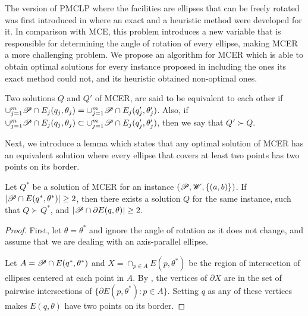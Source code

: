 The version of PMCLP where the facilities are ellipses that can be freely rotated was first introduced in \cite{andreta} where an exact and a heuristic method were developed for it. In comparison with MCE, this problem introduces a new variable that is responsible for determining the angle of rotation of every ellipse, making MCER a more challenging problem. We propose an algorithm for MCER which is able to obtain optimal solutions for every instance proposed in \cite{andreta} including the ones its exact method could not, and its heuristic obtained non-optimal ones.

\begin{definition}
	Two solutions $Q$ and $Q'$ of MCER, are said to be equivalent to each other if \mbox{$\cup_{j=1}^m \mathscr{P} \cap E_j(q_j, \theta_j) = \cup_{j=1}^m \mathscr{P} \cap E_j(q_j', \theta_j')$}. Also, if $\cup_{j=1}^m \mathscr{P} \cap E_j(q_j, \theta_j) \subset \cup_{j=1}^m \mathscr{P} \cap E_j(q_j', \theta_j')$, then we say that $Q' \succ Q$.
\end{definition}

Next, we introduce a lemma which states that any optimal solution of MCER has an equivalent solution where every ellipse that covers at least two points has two points on its border.

\begin{lem}\label{lema:mce_2b}
	Let $Q^*$ be a solution of MCER for an instance $(\mathscr{P}, \mathscr{W}, \{(a,b)\})$.
	If $|\mathscr{P} \cap E(q^*, \theta^*)| \ge 2$, then there exists a solution $Q$ for the same instance, such that $Q \succ Q^*$, and $|\mathscr{P} \cap \partial E(q, \theta)|\ge 2$.
\end{lem}

\begin{proof}
	First, let $\theta=\theta^*$ and ignore the angle of rotation as it does not change, and assume that we are dealing with an axis-parallel ellipse.
	
	Let $A=\mathscr{P} \cap E(q^*, \theta^*)$ and $X=\cap_{p \in A}E(p, \theta^*)$ be the region of intersection of ellipses centered at each point in $A$. By \cite{bi}, the vertices of $\partial X$ are in the set of pairwise intersections of $\{\partial E(p, \theta^*)\colon p \in A\}$. Setting $q$ as any of these vertices makes $E(q, \theta)$ have two points on its border.	
\end{proof}


